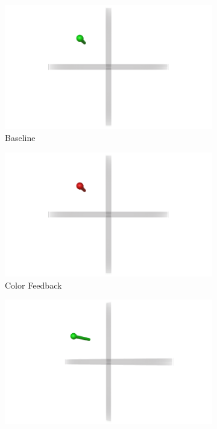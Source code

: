 \begin{figure}[t!]
    \begin{center}
        \begin{subfigure}{0.32\textwidth}
            \includegraphics[trim={5cm 0 5cm 0},clip,width=\linewidth]{figures/Baseline.png}
            \caption{Baseline}
            \label{fig:designs_baseline}
        \end{subfigure}\hfill
        \begin{subfigure}{0.32\textwidth}
            \includegraphics[trim={5cm 0 5cm 0},clip,width=\linewidth]{figures/Color.png}
            \caption{Color Feedback}
            \label{fig:designs_feedback}
        \end{subfigure}\hfill
        \begin{subfigure}{0.32\textwidth}
            \includegraphics[trim={5cm 0 5cm 0},clip,width=\linewidth]{figures/Angled.png}

\end{subfigure}
\end{center}
\end{figure}
